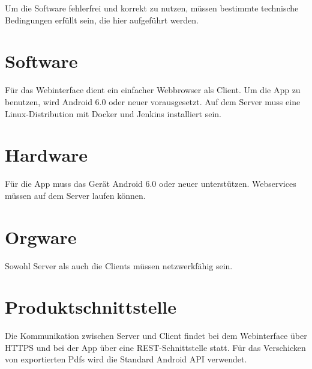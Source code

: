 Um die Software fehlerfrei und korrekt zu nutzen, müssen bestimmte technische Bedingungen erfüllt sein, die hier aufgeführt werden.

\section{Software}

Für das Webinterface dient ein einfacher Webbrowser als Client.
Um die App zu benutzen, wird Android 6.0 oder neuer vorausgesetzt.
\newline
\newline
Auf dem Server muss eine Linux-Distribution mit Docker und Jenkins installiert sein.

\section{Hardware}

Für die App muss das Gerät Android 6.0 oder neuer unterstützen.
\newline
\newline
Webservices müssen auf dem Server laufen können.


\section{Orgware}

Sowohl Server als auch die Clients müssen netzwerkfähig sein.


\section{Produktschnittstelle}

Die Kommunikation zwischen Server und Client findet bei dem Webinterface über HTTPS und bei der App über eine REST-Schnittstelle statt. Für das Verschicken von exportierten Pdfs wird die Standard Android API verwendet.